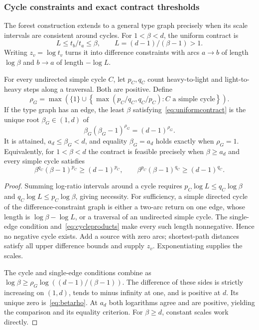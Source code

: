 \documentclass[manuscript,review,anonymous]{acmart}
\begin{document}
\subsubsection{Cycle constraints and exact contract thresholds}
The forest construction extends to a general type graph precisely when its scale intervals are consistent around cycles.
For $1<\beta<d$, the uniform contract is
\begin{equation}\label{eq:ratiointerval}
 L\le t_b/t_a\le\beta,\qquad L=(d-1)/(\beta-1)>1.
\end{equation}
Writing $z_v=\log t_v$ turns it into difference constraints with arcs $a\to b$ of length $\log\beta$ and $b\to a$ of length $-\log L$.
\begin{theorem}\label{thm:cycles}
For every undirected simple cycle $C$, let $p_C,q_C$ count heavy-to-light and light-to-heavy steps along a traversal. Both are positive. Define
\[
 \rho_G=\max\left(\{1\}\cup
 \left\{\max(p_C/q_C,q_C/p_C):C\text{ a simple cycle}\right\}\right).
\]
If the type graph has an edge, the least $\beta$ satisfying~\eqref{eq:uniformcontract} is the unique root $\beta_G\in(1,d)$ of
\begin{equation}\label{eq:betarho}
 \beta_G(\beta_G-1)^{\rho_G}=(d-1)^{\rho_G}.
\end{equation}
It is attained, $a_d\le\beta_G<d$, and equality $\beta_G=a_d$ holds exactly when $\rho_G=1$. Equivalently, for $1<\beta<d$ the contract is feasible precisely when $\beta\ge a_d$ and every simple cycle satisfies
\begin{equation}\label{eq:cycleproducts}
 \beta^{q_C}(\beta-1)^{p_C}\ge(d-1)^{p_C},\qquad
 \beta^{p_C}(\beta-1)^{q_C}\ge(d-1)^{q_C}.
\end{equation}
\end{theorem}
\begin{proof}
Summing log-ratio intervals around a cycle requires
$p_C\log L\le q_C\log\beta$ and $q_C\log L\le p_C\log\beta$, giving necessity. For sufficiency, a simple directed cycle of the difference-constraint graph is either a two-arc return on one edge, whose length is $\log\beta-\log L$, or a traversal of an undirected simple cycle. The single-edge condition and~\eqref{eq:cycleproducts} make every such length nonnegative. Hence no negative cycle exists. Add a source with zero arcs; shortest-path distances satisfy all upper difference bounds and supply $z_v$. Exponentiating supplies the scales.

The cycle and single-edge conditions combine as $\log\beta\ge\rho_G\log((d-1)/(\beta-1))$. The difference of these sides is strictly increasing on $(1,d)$, tends to minus infinity at one, and is positive at $d$. Its unique zero is~\eqref{eq:betarho}. At $a_d$ both logarithms agree and are positive, yielding the comparison and its equality criterion. For $\beta\ge d$, constant scales work directly.
\end{proof}
\end{document}
